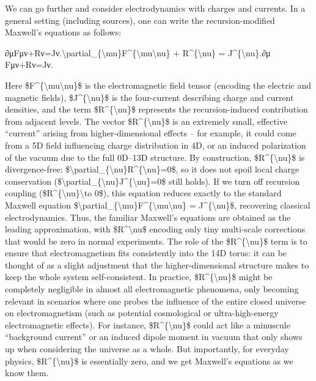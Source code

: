 \documentclass[]{article}
\begin{document}
We can go further and consider electrodynamics with charges and
currents. In a general setting (including sources), one can write the
recursion-modified Maxwell's equations as follows:

∂μFμν+Rν=Jν.\textbackslash{}partial\_\{\textbackslash{}mu\}F\^{}\{\textbackslash{}mu\textbackslash{}nu\}
+ R\^{}\{\textbackslash{}nu\} =
J\^{}\{\textbackslash{}nu\}.∂μ​Fμν+Rν=Jν.

Here \$F\^{}\{\textbackslash{}mu\textbackslash{}nu\}\$ is the
electromagnetic field tensor (encoding the electric and magnetic
fields), \$J\^{}\{\textbackslash{}nu\}\$ is the four-current describing
charge and current densities, and the term
\$R\^{}\{\textbackslash{}nu\}\$ represents the recursion-induced
contribution from adjacent levels. The vector
\$R\^{}\{\textbackslash{}nu\}\$ is an extremely small, effective
``current'' arising from higher-dimensional effects -- for example, it
could come from a 5D field influencing charge distribution in 4D, or an
induced polarization of the vacuum due to the full 0D--13D structure. By
construction, \$R\^{}\{\textbackslash{}nu\}\$ is divergence-free:
\$\textbackslash{}partial\_\{\textbackslash{}nu\}R\^{}\{\textbackslash{}nu\}=0\$,
so it does not spoil local charge conservation
(\$\textbackslash{}partial\_\{\textbackslash{}nu\}J\^{}\{\textbackslash{}nu\}=0\$
still holds). If we turn off recursion coupling
(\$R\^{}\{\textbackslash{}nu\}\textbackslash{}to 0\$), this equation
reduces exactly to the standard Maxwell equation
\$\textbackslash{}partial\_\{\textbackslash{}mu\}F\^{}\{\textbackslash{}mu\textbackslash{}nu\}
= J\^{}\{\textbackslash{}nu\}\$, recovering classical electrodynamics.
Thus, the familiar Maxwell's equations are obtained as the leading
approximation, with \$R\^{}\textbackslash{}nu\$ encoding only tiny
multi-scale corrections that would be zero in normal experiments. The
role of the \$R\^{}\{\textbackslash{}nu\}\$ term is to ensure that
electromagnetism fits consistently into the 14D torus: it can be thought
of as a slight adjustment that the higher-dimensional structure makes to
keep the whole system self-consistent. In practice,
\$R\^{}\{\textbackslash{}nu\}\$ might be completely negligible in almost
all electromagnetic phenomena, only becoming relevant in scenarios where
one probes the influence of the entire closed universe on
electromagnetism (such as potential cosmological or ultra-high-energy
electromagnetic effects). For instance, \$R\^{}\{\textbackslash{}nu\}\$
could act like a minuscule ``background current'' or an induced dipole
moment in vacuum that only shows up when considering the universe as a
whole. But importantly, for everyday physics,
\$R\^{}\{\textbackslash{}nu\}\$ is essentially zero, and we get
Maxwell's equations as we know them.
\end{document}
